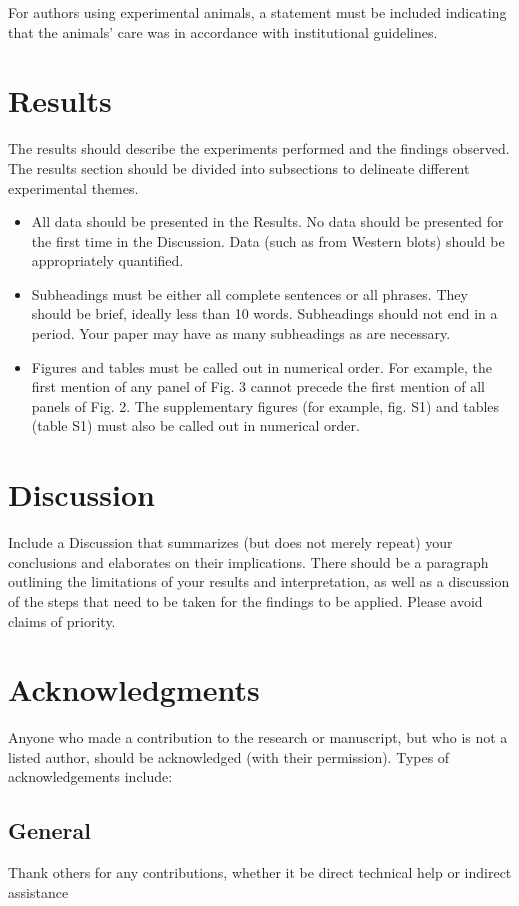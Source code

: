 \documentclass{article}
\begin{document}
For authors using experimental animals, a statement must be included indicating that the animals’ care was in accordance with institutional guidelines.

\section{Results}
The results should describe the experiments performed and the findings observed. The results section should be divided into subsections to delineate different experimental themes. 
\begin{itemize}
    \item All data should be presented in the Results. No data should be presented for the first time in the Discussion. Data (such as from Western blots) should be appropriately quantified.
    \item Subheadings must be either all complete sentences or all phrases. They should be brief, ideally less than 10 words. Subheadings should not end in a period. Your paper may have as many subheadings as are necessary.
    \item Figures and tables must be called out in numerical order. For example, the first mention of any panel of Fig. 3 cannot precede the first mention of all panels of Fig. 2. The supplementary figures (for example, fig. S1) and tables (table S1) must also be called out in numerical order. 
\end{itemize}

\section{Discussion}
Include a Discussion that summarizes (but does not merely repeat) your conclusions and elaborates on their implications. There should be a paragraph outlining the limitations of your results and interpretation, as well as a discussion of the steps that need to be taken for the findings to be applied. Please avoid claims of priority. 

\section*{Acknowledgments}
Anyone who made a contribution to the research or manuscript, but who is not a listed author, should be acknowledged (with their permission). Types of acknowledgements include:

\subsection*{General} 
Thank others for any contributions, whether it be direct technical help or indirect assistance 
\end{document}
